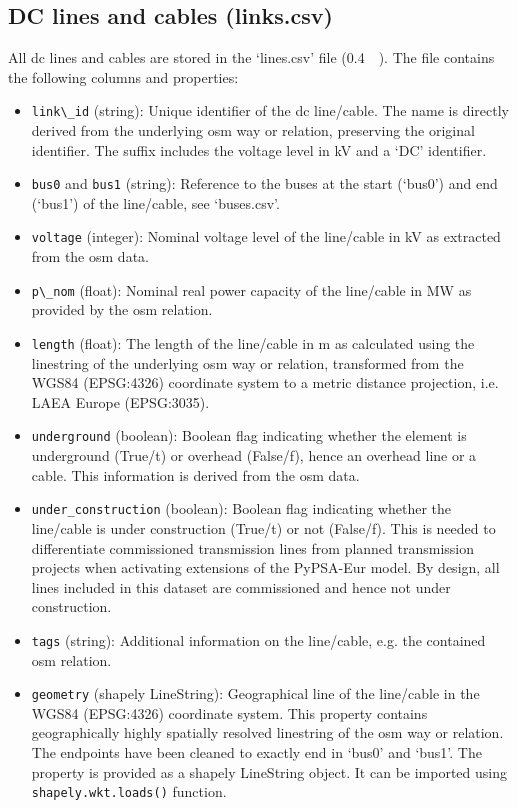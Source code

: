 \documentclass[fleqn,10pt]{wlscirep}
\newcommand{\colorcode}[1]{\colorbox{gray!20}{\lstinline|#1|}}
\begin{document}
\subsection*{DC lines and cables (links.csv)}
All \acrshort{dc} lines and cables are stored in the `lines.csv' file (\SI{0.4}{\mega\byte}). The file contains the following columns and properties:
\begin{itemize}
    \item \colorcode{link\_id} (string): Unique identifier of the \acrshort{dc} line/cable. The name is directly derived from the underlying \acrshort{osm} way or relation, preserving the original identifier. The suffix includes the voltage level in \si{\kilo\volt} and a `DC' identifier.
    \item \colorcode{bus0} and \colorcode{bus1} (string): Reference to the buses at the start (`bus0') and end (`bus1') of the line/cable, see `buses.csv'.
    \item \colorcode{voltage} (integer): Nominal voltage level of the line/cable in \si{\kilo\volt} as extracted from the \acrshort{osm} data.
    \item \colorcode{p\_nom} (float): Nominal real power capacity of the line/cable in \si{\mega\watt} as provided by the \acrshort{osm} relation.
    
    \item \colorcode{length} (float): The length of the line/cable in \si{\meter} as calculated using the linestring of the underlying \acrshort{osm} way or relation, transformed from the WGS84 (EPSG:4326) coordinate system to a metric distance projection, i.e. LAEA Europe (EPSG:3035).
    \item \colorcode{underground} (boolean): Boolean flag indicating whether the element is underground (True/t) or overhead (False/f), hence an overhead line or a cable. This information is derived from the \acrshort{osm} data.
    \item \colorcode{under_construction} (boolean): Boolean flag indicating whether the line/cable is under construction (True/t) or not (False/f). This is needed to differentiate commissioned transmission lines from planned transmission projects when activating extensions of the PyPSA-Eur model. By design, all lines included in this dataset are commissioned and hence not under construction.
    \item \colorcode{tags} (string): Additional information on the line/cable, e.g. the contained \acrshort{osm} relation.
    \item \colorcode{geometry} (shapely LineString): Geographical line of the line/cable in the WGS84 (EPSG:4326) coordinate system. This property contains geographically highly spatially resolved linestring of the \acrshort{osm} way or relation. The endpoints have been cleaned to exactly end in `bus0' and `bus1'. The property is provided as a shapely LineString object.\cite{gilliesShapely2024} It can be imported using \colorcode{shapely.wkt.loads()} function.
\end{itemize}
\end{document}
